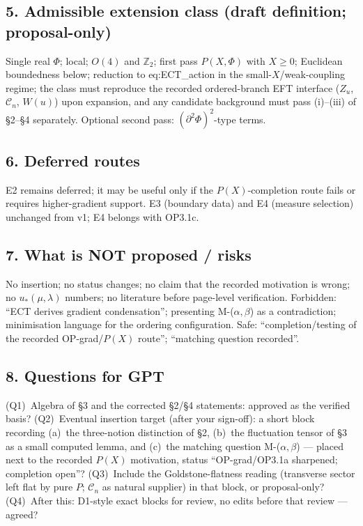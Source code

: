 \subsection*{5. Admissible extension class (draft definition;
proposal-only)}
Single real $\Phi$; local; $O(4)$ and $\mathbb Z_2$; first pass
$P(X,\Phi)$ with $X\ge0$; Euclidean boundedness below; reduction
to eq:ECT\_action in the small-$X$/weak-coupling regime; the class
must reproduce the recorded ordered-branch EFT interface
($Z_u$, $\mathcal C_n$, $W(u)$) upon expansion, and any candidate
background must pass (i)--(iii) of \S2--\S4 separately.
Optional second pass: $(\partial^2\Phi)^2$-type terms.

\subsection*{6. Deferred routes}
E2 remains deferred; it may be useful only if the
$P(X)$-completion route fails or requires higher-gradient support.
E3 (boundary data) and E4 (measure selection) unchanged from v1;
E4 belongs with OP3.1c.

\subsection*{7. What is NOT proposed / risks}
No insertion; no status changes; no claim that the recorded
motivation is wrong; no $u_*(\mu,\lambda)$ numbers; no literature
before page-level verification.
Forbidden: ``ECT derives gradient condensation''; presenting
M-($\alpha,\beta$) as a contradiction; minimisation language for
the ordering configuration.
Safe: ``completion/testing of the recorded OP-grad/$P(X)$ route'';
``matching question recorded''.

\subsection*{8. Questions for GPT}
(Q1)~Algebra of \S3 and the corrected \S2/\S4 statements: approved
as the verified basis?
(Q2)~Eventual insertion target (after your sign-off): a short
block recording (a)~the three-notion distinction of \S2, (b)~the
fluctuation tensor of \S3 as a small computed lemma, and (c)~the
matching question M-($\alpha,\beta$) --- placed next to the
recorded $P(X)$ motivation, status ``OP-grad/OP3.1a sharpened;
completion open''?
(Q3)~Include the Goldstone-flatness reading (transverse sector
left flat by pure $P$; $\mathcal C_n$ as natural supplier) in that
block, or proposal-only?
(Q4)~After this: D1-style exact blocks for review, no edits before
that review --- agreed?
